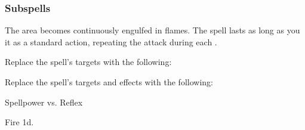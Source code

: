 \subsubsection{Subspells}



The area becomes continuously engulfed in flames.
The spell lasts as long as you  it as a standard action, repeating the attack during each .









Replace the spell's targets with the following:
\begin{spellcontent}

\begin{augmenttargetinginfo}




\end{augmenttargetinginfo}

\end{spellcontent}








Replace the spell's targets and effects with the following:
\begin{spellcontent}

\begin{augmenttargetinginfo}




\end{augmenttargetinginfo}


\begin{augmenteffects}




\begin{spellattack}{Spellpower vs. Reflex}


\spellsuccess Fire  \plus1d.


\end{spellattack}



\end{augmenteffects}

\end{spellcontent}





